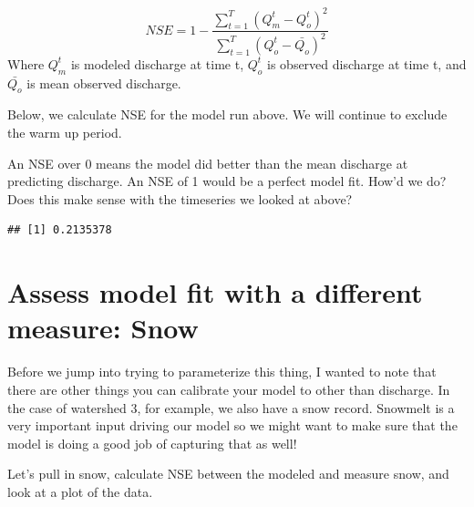 \documentclass[
]{book}
\newenvironment{Shaded}{\begin{snugshade}}{\end{snugshade}}
\newcommand{\CommentTok}[1]{\textcolor[rgb]{0.56,0.35,0.01}{\textit{#1}}}
\newcommand{\DecValTok}[1]{\textcolor[rgb]{0.00,0.00,0.81}{#1}}
\newcommand{\FunctionTok}[1]{\textcolor[rgb]{0.00,0.00,0.00}{#1}}
\newcommand{\NormalTok}[1]{#1}
\newcommand{\OtherTok}[1]{\textcolor[rgb]{0.56,0.35,0.01}{#1}}
\newcommand{\SpecialCharTok}[1]{\textcolor[rgb]{0.00,0.00,0.00}{#1}}
\begin{document}
\[
NSE = 1 - \frac{\sum_{t = 1}^{T}{(Q_m^t - Q_o^t)^2}}{\sum_{t = 1}^{T}{(Q_o^t - \bar{Q_o})^2}}
\]
Where \(Q_m^t\) is modeled discharge at time t, \(Q_o^t\) is observed discharge at time t, and \(\bar{Q_o}\) is mean observed discharge.

Below, we calculate NSE for the model run above. We will continue to exclude the warm up period.

An NSE over 0 means the model did better than the mean discharge at predicting discharge. An NSE of 1 would be a perfect model fit. How'd we do? Does this make sense with the timeseries we looked at above?

\begin{Shaded}
\end{Shaded}

\begin{verbatim}
## [1] 0.2135378
\end{verbatim}

\hypertarget{assess-model-fit-with-a-different-measure-snow}{%
\section{Assess model fit with a different measure: Snow}\label{assess-model-fit-with-a-different-measure-snow}}

Before we jump into trying to parameterize this thing, I wanted to note that there are other things you can calibrate your model to other than discharge. In the case of watershed 3, for example, we also have a snow record. Snowmelt is a very important input driving our model so we might want to make sure that the model is doing a good job of capturing that as well!

Let's pull in snow, calculate NSE between the modeled and measure snow, and look at a plot of the data.
\end{document}
